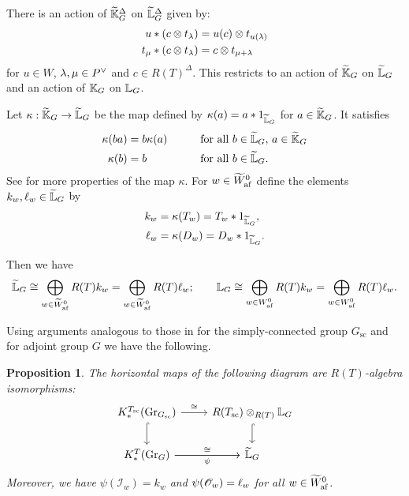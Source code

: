 \documentclass[a4paper]{amsart}
\newcommand{\koushik}[1]{\todo[size=\tiny,color=green!30]{#1}}
\newtheorem{prop}[thm]{Proposition}
\theoremstyle{remark}
\numberwithin{equation}{section}
\begin{document}
    
There is an action of $\widetilde{\mathbb{K}}_G^\Delta$ on $\widetilde{\mathbb{L}}_G^\Delta$ \cite{Kato} given by:
\begin{align}
\label{E:action W}
  u * (c \otimes t_\lambda ) &= u(c) \otimes t_{u(\lambda)} \\
\label{E:action t}
  t_\mu *(c \otimes t_\lambda) &= c \otimes t_{\mu+\lambda}  
\end{align}
for $u\in W$, $\lambda,\mu\in P^\lor$ and $c\in R(T)^\Delta$.
This restricts to an action of $\widetilde{\mathbb{K}}_G$ on $\widetilde{\mathbb{L}}_G$ and an action of $\mathbb{K}_G$ on $\mathbb{L}_G$.


Let $\kappa: \widetilde{\mathbb{K}}_G\to\widetilde{\mathbb{L}}_G$ be the map defined by $\kappa(a) = a*1_{\widetilde{\mathbb{L}}_G}$ for $a\in \widetilde{\mathbb{K}}_G$.
It satisfies
\begin{align}\label{E:kappa L linear}
    \kappa(ba) &= b \kappa(a)&\qquad&\text{for all $b\in\widetilde{\mathbb{L}}_G$, $a\in\widetilde{\mathbb{K}}_G$} \\
    \kappa(b) &= b &&\text{for all $b\in\widetilde{\mathbb{L}}_G$.}
\end{align}
See \cite[\S 2.3.2]{ISY} for more properties of the map $\kappa.$
For $w\in \widetilde{W}_{\mathrm{af}}^0$ define the elements $k_w,\ell_w\in \widetilde{\mathbb{L}}_G$ by
\begin{align}\label{E:kw}
  k_w &= \kappa(T_w)=T_w* 1_{\widetilde{\mathbb{L}}_G}, \\
  \label{E:lw}
  \ell_w &= \kappa(D_w)=D_w* 1_{\widetilde{\mathbb{L}}_G}.
\end{align}

Then we have $$\widetilde{\mathbb{L}}_G \cong \bigoplus_{w\in \widetilde{W}_{\mathrm{af}}^0} R(T)k_w=\bigoplus_{w\in \widetilde{W}_{\mathrm{af}}^0} R(T)\ell_w;\qquad \mathbb{L}_G \cong \bigoplus_{w\in W_{\mathrm{af}}^0} R(T)k_w=\bigoplus_{w\in W_{\mathrm{af}}^0} R(T)\ell_w.$$



Using arguments analogous to those in \cite{LSS:K} for the simply-connected group $G_{\text{sc}}$ and  \cite{ISY} for adjoint group $G$ we have the following.
\begin{prop}
    The horizontal maps of the following diagram are $R(T)$-algebra isomorphisms:
\begin{equation}\label{E:geom to algebra iso}
\begin{tikzcd}
K^{\Tsc}_*(\Gr_{G_{\text{sc}}}) \arrow[r,"\cong"] \arrow[d,hookrightarrow] & R(\Tsc)\otimes_{R(T)}
\LG \arrow[d,hookrightarrow] \\
K^T_*(\Gr_G) \arrow[r, swap, "\psi"]\arrow[r,"\cong"] & \tLG 
\end{tikzcd}
\end{equation}
Moreover, we have $\psi(\mathscr{I}_w) = k_w$ and
$\psi(\mathscr{O}_{w})=\ell_w$ for all $w\in \widetilde{W}_{\mathrm{af}}^0$.
\end{prop}
\end{document}

